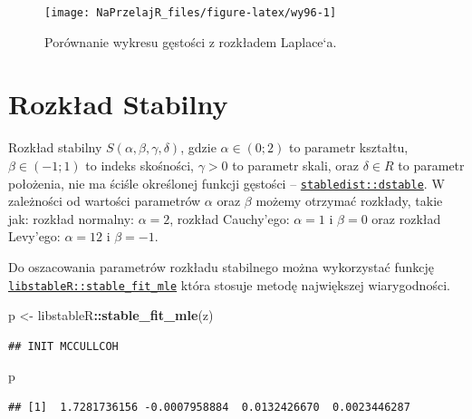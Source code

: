 \documentclass[polish,]{book}
\newenvironment{Shaded}{\begin{snugshade}}{\end{snugshade}}
\newcommand{\KeywordTok}[1]{\textcolor[rgb]{0.13,0.29,0.53}{\textbf{#1}}}
\newcommand{\NormalTok}[1]{#1}
\newcommand{\OperatorTok}[1]{\textcolor[rgb]{0.81,0.36,0.00}{\textbf{#1}}}
\newcommand{\StringTok}[1]{\textcolor[rgb]{0.31,0.60,0.02}{#1}}
\begin{document}
\begin{figure}[h]

{\centering \texttt{[image: NaPrzelajR\_files/figure-latex/wy96-1]} 

}

\caption{Porównanie wykresu gęstości z rozkładem Laplace`a.}\label{fig:wy96}
\end{figure}

\hypertarget{part_9.6}{%
\section{Rozkład Stabilny}\label{part_9.6}}

Rozkład stabilny \(S(\alpha, \beta, \gamma, \delta)\), gdzie \(\alpha \in(0; 2)\) to parametr kształtu, \(\beta \in(-1; 1)\)
to indeks skośności, \(\gamma > 0\) to parametr skali, oraz \(\delta \in R\) to parametr położenia,
nie ma ściśle określonej funkcji gęstości -- \href{https://rdrr.io/cran/stabledist/man/dist-stable.html}{\texttt{stabledist::dstable}}. W zależności od wartości parametrów \(\alpha\)
oraz \(\beta\) możemy otrzymać rozkłady, takie jak: rozkład normalny: \(\alpha = 2\), rozkład
Cauchy'ego: \(\alpha = 1\) i \(\beta = 0\) oraz rozkład Levy'ego: \(\alpha = 12\) i \(\beta = -1\).

Do oszacowania parametrów rozkładu stabilnego można wykorzystać funkcję \href{https://rdrr.io/cran/libstableR/man/stable_fit.html}{\texttt{libstableR::stable\_fit\_mle}} która stosuje metodę największej wiarygodności.

\begin{Shaded}
\begin{Highlighting}[]
\NormalTok{p <-}\StringTok{ }\NormalTok{libstableR}\OperatorTok{::}\KeywordTok{stable_fit_mle}\NormalTok{(z)}
\end{Highlighting}
\end{Shaded}

\begin{verbatim}
## INIT MCCULLCOH
\end{verbatim}

\begin{Shaded}
\begin{Highlighting}[]
\NormalTok{p}
\end{Highlighting}
\end{Shaded}

\begin{verbatim}
## [1]  1.7281736156 -0.0007958884  0.0132426670  0.0023446287
\end{verbatim}
\end{document}
